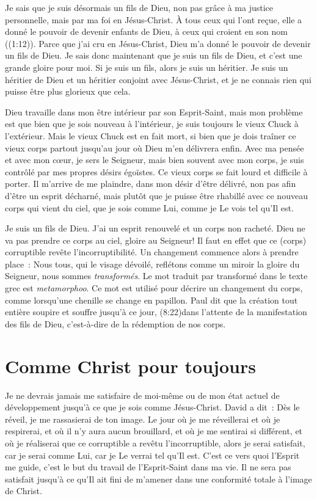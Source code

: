 Je sais que je suis désormais un fils de Dieu,
 non pas grâce à ma justice personnelle,
 mais par ma foi en Jésus-Christ.
 \og À tous ceux qui l'ont reçue, elle a donné le pouvoir
 de devenir enfants de Dieu,
 à ceux qui croient en son nom \fg{} ((1:12)).
 Parce que j'ai cru en Jésus-Christ, Dieu m'a donné le pouvoir
 de devenir un fils de Dieu.
 Je sais donc maintenant que je suis un fils de Dieu,
 et c'est une grande gloire pour moi.
 Si je suis un fils, alors je suis un héritier.
 Je suis un héritier de Dieu et un héritier conjoint avec Jésus-Christ,
 et je ne connais rien qui puisse être plus glorieux que cela.

Dieu travaille dans mon être intérieur par son Esprit-Saint,
 mais mon problème est que bien que je sois nouveau à l'intérieur,
 je suis toujours le vieux Chuck à l'extérieur.
 Mais le vieux Chuck est en fait mort, si bien que je dois traîner
 ce vieux corps partout jusqu'au jour où Dieu m'en délivrera enfin.
 Avec ma pensée et avec mon cœur, je sers le Seigneur,
 mais bien souvent avec mon corps,
 je suis contrôlé par mes propres désirs égoïstes.
 Ce vieux corps se fait lourd et difficile à porter.
 Il m'arrive de me plaindre, dans mon désir d'être délivré,
 non pas afin d'être un esprit décharné, mais plutôt que je puisse
 être rhabillé avec ce nouveau corps qui vient du ciel,
 que je sois comme Lui, comme je Le vois tel qu'Il est.

Je suis un fils de Dieu. J'ai un esprit renouvelé et un corps non racheté.
 Dieu ne va pas prendre ce corps au ciel, gloire au Seigneur!
 \og Il faut en effet que ce (corps) corruptible
 revête l'incorruptibilité. \fg{}
 Un changement commence alors à prendre place~:
 \og Nous tous, qui le visage dévoilé,
 reflétons comme un miroir la gloire du Seigneur,
 nous sommes \emph{transformés}. \fg{}
 Le mot traduit par \og transformé \fg{}
 dans le texte grec est \emph{metamorphoo}.
 Ce mot est utilisé pour décrire un changement du corps,
 comme lorsqu'une chenille se change en papillon.
 Paul dit que la création tout entière soupire et souffre
 jusqu'à ce jour, (8:22)dans l'attente
 de la manifestation des fils de Dieu,
 c'est-à-dire de la rédemption de nos corps.


\section{Comme Christ pour toujours}

Je ne devrais jamais me satisfaire de moi-même ou de mon état actuel
 de développement jusqu'à ce que je sois comme Jésus-Christ.
 David a dit~:
 \og Dès le réveil, je me rassasierai de ton image. \fg{}
 Le jour où je me réveillerai et où je respirerai,
 et où il n'y aura aucun brouillard, et où je me sentirai si différent,
 et où je réaliserai que ce corruptible a revêtu l'incorruptible,
 alors je serai satisfait, car je serai comme Lui, car je Le verrai
 tel qu'Il est. C'est ce vers quoi l'Esprit me guide,
 c'est le but du travail de l'Esprit-Saint dans ma vie.
 Il ne sera pas satisfait jusqu'à ce qu'Il ait fini de m'amener
 dans une conformité totale à l'image de Christ.

